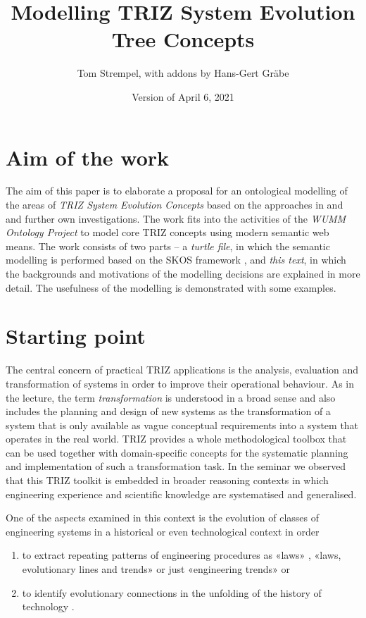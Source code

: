 \documentclass[11pt,a4paper]{article}
\title{Modelling TRIZ System Evolution Tree Concepts}
\author{Tom Strempel, with addons by Hans-Gert Gr\"abe}
\date{Version of April 6, 2021}
\begin{document}
\maketitle

\section{Aim of the work}

The aim of this paper is to elaborate a proposal for an ontological modelling
of the areas of \emph{TRIZ System Evolution Concepts} based on the approaches
in \cite{TESE2018} and \cite{Shpakovsky2016} and further own investigations.
The work fits into the activities of the \emph{WUMM Ontology Project}
\cite{WUMM} to model core TRIZ concepts using modern semantic web means.  The
work consists of two parts -- a \emph{turtle file}, in which the semantic
modelling is performed based on the SKOS framework \cite{SKOS}, and \emph{this
  text}, in which the backgrounds and motivations of the modelling decisions
are explained in more detail. The usefulness of the modelling is demonstrated
with some examples.

\section{Starting point} 

The central concern of practical TRIZ applications is the analysis, evaluation
and transformation of systems in order to improve their operational behaviour.
As in the lecture, the term \emph{transformation} is understood in a broad
sense and also includes the planning and design of new systems as the
transformation of a system that is only available as vague conceptual
requirements into a system that operates in the real world. TRIZ provides a
whole methodological toolbox that can be used together with domain-specific
concepts for the systematic planning and implementation of such a
transformation task. In the seminar we observed that this TRIZ toolkit is
embedded in broader reasoning contexts in which engineering experience and
scientific knowledge are systematised and generalised.

One of the aspects examined in this context is the evolution of classes of
engineering systems in a historical or even technological context in order 
\begin{enumerate}
\item to extract repeating patterns of engineering procedures as «laws»
  \cite{Altshuller1979}, «laws, evolutionary lines and trends» \cite{KS} or
  just «engineering trends» \cite{TESE2018} or
\item to identify evolutionary connections in the unfolding of the history of
  technology \cite{Shpakovsky2016}.
\end{enumerate}
\end{document}
